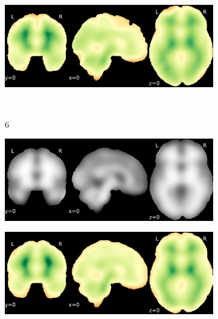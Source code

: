 \documentclass{article}
\begin{document}
\begin{appendices}
\begin{landscape}
\begin{figure}
\begin{subfigure}[t]{0.2\paperheight}
            \end{subfigure}
            \begin{subfigure}[t]{0.2\paperheight}
                \centering
                \includegraphics[width=\textwidth]{figures/sig/20mm/rr.rs_ds001748_sub-adult15_sig.pdf}
            \end{subfigure} \\
            \begin{subfigure}[b][][c]{0.01\paperwidth} 6 \vspace*{15pt} \end{subfigure}
            \begin{subfigure}[t]{0.2\paperheight}
                \centering
                \includegraphics[width=\textwidth]{figures/sig/20mm/ieee_ds001748_sub-adult16.pdf}
            \end{subfigure}
            \begin{subfigure}[t]{0.2\paperheight}
                \centering
                \includegraphics[width=\textwidth]{figures/sig/20mm/rr_ds001748_sub-adult16_sig.pdf}

\end{subfigure}
\end{figure}
\end{landscape}
\end{appendices}
\end{document}
